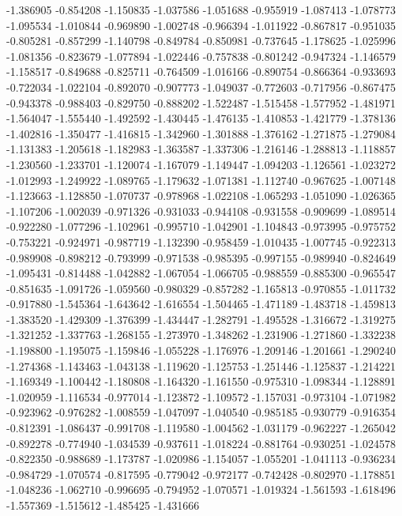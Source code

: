 -1.386905
-0.854208
-1.150835
-1.037586
-1.051688
-0.955919
-1.087413
-1.078773
-1.095534
-1.010844
-0.969890
-1.002748
-0.966394
-1.011922
-0.867817
-0.951035
-0.805281
-0.857299
-1.140798
-0.849784
-0.850981
-0.737645
-1.178625
-1.025996
-1.081356
-0.823679
-1.077894
-1.022446
-0.757838
-0.801242
-0.947324
-1.146579
-1.158517
-0.849688
-0.825711
-0.764509
-1.016166
-0.890754
-0.866364
-0.933693
-0.722034
-1.022104
-0.892070
-0.907773
-1.049037
-0.772603
-0.717956
-0.867475
-0.943378
-0.988403
-0.829750
-0.888202
-1.522487
-1.515458
-1.577952
-1.481971
-1.564047
-1.555440
-1.492592
-1.430445
-1.476135
-1.410853
-1.421779
-1.378136
-1.402816
-1.350477
-1.416815
-1.342960
-1.301888
-1.376162
-1.271875
-1.279084
-1.131383
-1.205618
-1.182983
-1.363587
-1.337306
-1.216146
-1.288813
-1.118857
-1.230560
-1.233701
-1.120074
-1.167079
-1.149447
-1.094203
-1.126561
-1.023272
-1.012993
-1.249922
-1.089765
-1.179632
-1.071381
-1.112740
-0.967625
-1.007148
-1.123663
-1.128850
-1.070737
-0.978968
-1.022108
-1.065293
-1.051090
-1.026365
-1.107206
-1.002039
-0.971326
-0.931033
-0.944108
-0.931558
-0.909699
-1.089514
-0.922280
-1.077296
-1.102961
-0.995710
-1.042901
-1.104843
-0.973995
-0.975752
-0.753221
-0.924971
-0.987719
-1.132390
-0.958459
-1.010435
-1.007745
-0.922313
-0.989908
-0.898212
-0.793999
-0.971538
-0.985395
-0.997155
-0.989940
-0.824649
-1.095431
-0.814488
-1.042882
-1.067054
-1.066705
-0.988559
-0.885300
-0.965547
-0.851635
-1.091726
-1.059560
-0.980329
-0.857282
-1.165813
-0.970855
-1.011732
-0.917880
-1.545364
-1.643642
-1.616554
-1.504465
-1.471189
-1.483718
-1.459813
-1.383520
-1.429309
-1.376399
-1.434447
-1.282791
-1.495528
-1.316672
-1.319275
-1.321252
-1.337763
-1.268155
-1.273970
-1.348262
-1.231906
-1.271860
-1.332238
-1.198800
-1.195075
-1.159846
-1.055228
-1.176976
-1.209146
-1.201661
-1.290240
-1.274368
-1.143463
-1.043138
-1.119620
-1.125753
-1.251446
-1.125837
-1.214221
-1.169349
-1.100442
-1.180808
-1.164320
-1.161550
-0.975310
-1.098344
-1.128891
-1.020959
-1.116534
-0.977014
-1.123872
-1.109572
-1.157031
-0.973104
-1.071982
-0.923962
-0.976282
-1.008559
-1.047097
-1.040540
-0.985185
-0.930779
-0.916354
-0.812391
-1.086437
-0.991708
-1.119580
-1.004562
-1.031179
-0.962227
-1.265042
-0.892278
-0.774940
-1.034539
-0.937611
-1.018224
-0.881764
-0.930251
-1.024578
-0.822350
-0.988689
-1.173787
-1.020986
-1.154057
-1.055201
-1.041113
-0.936234
-0.984729
-1.070574
-0.817595
-0.779042
-0.972177
-0.742428
-0.802970
-1.178851
-1.048236
-1.062710
-0.996695
-0.794952
-1.070571
-1.019324
-1.561593
-1.618496
-1.557369
-1.515612
-1.485425
-1.431666

